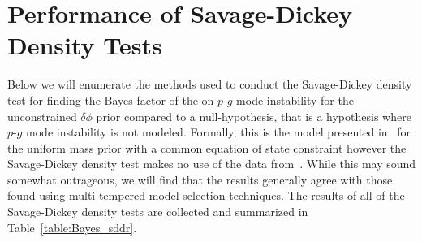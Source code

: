 




\section{Performance of Savage-Dickey Density Tests}\label{sec:prob_density_estimator_performance}
Below we will enumerate the methods used to conduct the Savage-Dickey density test for finding the Bayes factor of the  on $p$-$g$ mode instability for the unconstrained $\delta \phi$ prior compared to a null-hypothesis, that is a hypothesis where $p$-$g$ mode instability is not modeled. Formally, this is the model presented in~\cite{de2018tidal} for the uniform mass prior with a common equation of state constraint however the Savage-Dickey density test makes no use of the data from~\cite{de2018tidal}. While this may sound somewhat outrageous, we will find that the results generally agree with those found using multi-tempered model selection techniques. The results of all of the Savage-Dickey density tests are collected and summarized in Table~\ref{table:Bayes_sddr}. 

